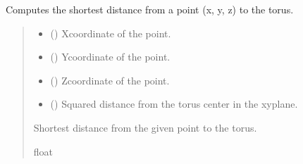 \documentclass[letterpaper,10pt,english]{sphinxmanual}
\begin{document}
\begin{fulllineitems}
\begin{fulllineitems}
\end{fulllineitems}


\begin{fulllineitems}
\label{\detokenize{src:src.Torus.Torus.distance}}
\pysigstartsignatures
{}
\pysigstopsignatures
\sphinxAtStartPar
Computes the shortest distance from a point (x, y, z) to the torus.
\begin{quote}\begin{description}
\begin{itemize}
\item {} 
\sphinxAtStartPar
{} () \textendash{} X\sphinxhyphen{}coordinate of the point.

\item {} 
\sphinxAtStartPar
{} () \textendash{} Y\sphinxhyphen{}coordinate of the point.

\item {} 
\sphinxAtStartPar
{} () \textendash{} Z\sphinxhyphen{}coordinate of the point.

\item {} 
\sphinxAtStartPar
{} () \textendash{} Squared distance from the torus center in the xy\sphinxhyphen{}plane.

\end{itemize}

\sphinxAtStartPar
Shortest distance from the given point to the torus.

\sphinxAtStartPar
float

\end{description}\end{quote}

\end{fulllineitems}


\end{fulllineitems}
\end{document}

